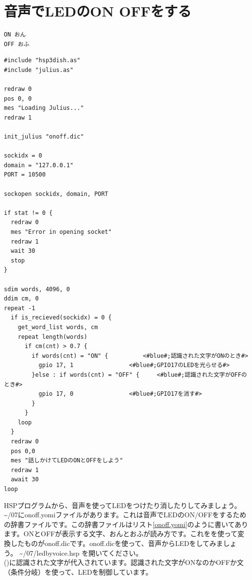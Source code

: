 \newpage
\section{音声でLEDのON OFFをする}

\begin{lstlisting}[caption=onoff.yomi,label=onoff.yomi]
ON おん
OFF おふ
\end{lstlisting}

\begin{lstlisting}[caption=ledbyvoice.hsp,label=ledbyvoice.hsp]
#include "hsp3dish.as"
#include "julius.as"

redraw 0
pos 0, 0
mes "Loading Julius..."
redraw 1

init_julius "onoff.dic"

sockidx = 0
domain = "127.0.0.1"
PORT = 10500

sockopen sockidx, domain, PORT

if stat != 0 {
  redraw 0
  mes "Error in opening socket"
  redraw 1
  wait 30
  stop
}

sdim words, 4096, 0
ddim cm, 0
repeat -1
  if is_recieved(sockidx) = 0 {
    get_word_list words, cm
    repeat length(words)
      if cm(cnt) > 0.7 {
        if words(cnt) = "ON" {			<#blue#;認識された文字がONのとき#>
          gpio 17, 1				<#blue#;GPIO17のLEDを光らせる#>
        }else : if words(cnt) = "OFF" {		<#blue#;認識された文字がOFFのとき#>
          gpio 17, 0				<#blue#;GPIO17を消す#>
        }
      }
    loop
  }
  redraw 0
  pos 0,0
  mes "話しかけてLEDのONとOFFをしよう"
  redraw 1
  await 30
loop
\end{lstlisting}

HSPプログラムから、音声を使ってLEDをつけたり消したりしてみましょう。 \textasciitilde /07にonoff.yomiファイルがあります。これは音声でLEDのON/OFFをするための辞書ファイルです。この辞書ファイルはリスト\ref{onoff.yomi}のように書いてあります。ONとOFFが表示する文字、おんとおふが読み方です。これをを使って変換したものがonoff.dicです。onoff.dicを使って、音声からLEDをしてみましょう。 \textasciitilde /07/ledbyvoice.hsp を開いてください。\\

()に認識された文字が代入されています。認識された文字がONなのかOFFか文（条件分岐）を使って、LEDを制御しています。\\

\begin{tcolorbox}[title=\useOmetoi]
\begin{enumerate}
\end{enumerate}
\end{tcolorbox}
